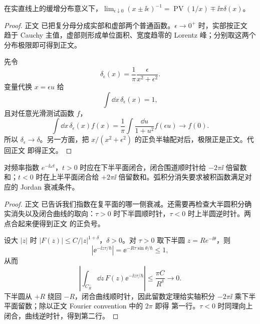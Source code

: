 \begin{theorem}
在实直线上的缓增分布意义下，$\lim_{\epsilon\downarrow0}(x\pm\ii\epsilon)^{-1}=\operatorname{PV}(1/x)\mp\ii\pi\delta(x)$。
\end{theorem}
\begin{proof}
正文 已把复分母分成实部和虚部两个普通函数。$\epsilon\to0^+$ 时，实部按正文 趋于 Cauchy 主值，虚部则形成单位面积、宽度趋零的 Lorentz 峰；分别取这两个分布极限即可得到正文。

先令
\begin{equation*}
 \delta_\epsilon(x)
 =\frac1\pi\frac{\epsilon}{x^2+\epsilon^2}.
\end{equation*}
变量代换 $x=\epsilon u$ 给
\begin{equation*}
 \int\dd x\,\delta_\epsilon(x)=1,
\end{equation*}
且对任意光滑测试函数 $f$，
\begin{equation*}
 \int\dd x\,\delta_\epsilon(x)f(x)
 =\frac1\pi\int\frac{\dd u}{1+u^2}f(\epsilon u)
 \longrightarrow f(0).
\end{equation*}
所以 $\delta_\epsilon\to\delta$。另一方面，把
$x/(x^2+\epsilon^2)$ 的正负半轴配对后，极限正是正文。代回正文 即得正文。
\end{proof}

\begin{proposition}[指数核围道的方向与留数]
对频率指数 $e^{-\ii\omega t}$，$t>0$ 时应在下半平面闭合，闭合围道顺时针给 $-2\pi\ii$ 倍留数和；$t<0$ 时在上半平面闭合给 $+2\pi\ii$ 倍留数和。弧积分消失要求被积函数满足对应的 Jordan 衰减条件。
\end{proposition}
\begin{proof}
正文 已告诉我们指数在复平面的哪一侧衰减。还需要再检查大半圆积分确实消失以及闭合曲线的取向：$\tau>0$ 时下半圆顺时针，$\tau<0$ 时上半圆逆时针。两点合起来便得到正文 的正负号。

设大 $|z|$ 时 $|F(z)|\le C/|z|^{1+\delta}$，$\delta>0$。对 $\tau>0$ 取下半圆 $z=Re^{-\ii\theta}$，则
\begin{equation*}
 |\ee^{-\ii z\tau/\hbar}|=\ee^{-R\tau\sin\theta/\hbar}\le1,
\end{equation*}
从而
\begin{equation*}
 \left|\int_{C_R^-}\dd z\,F(z)\ee^{-\ii z\tau/\hbar}\right|
 \le\frac{\pi C}{R^\delta}\to0.
\end{equation*}
下半圆从 $+R$ 绕回 $-R$，闭合曲线顺时针，因此留数定理给实轴积分
$-2\pi\ii$ 乘下半平面留数；除以正文 Fourier convention 中的 $2\pi$ 即得 第一行。$\tau<0$ 时同理向上闭合，曲线逆时针，得到第二行。
\end{proof}
